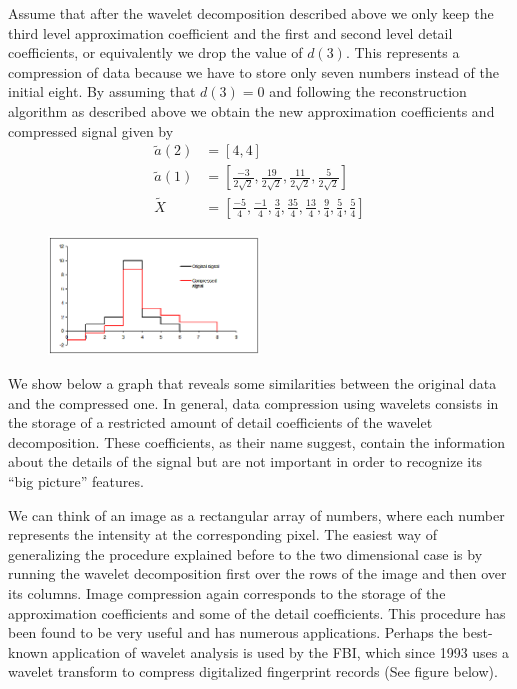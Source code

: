 
Assume that after the wavelet decomposition described above we only keep the third level approximation coefficient and the first and second level detail coefficients, or equivalently we drop the value of $d(3)$. This represents a compression of data because we have to store only seven numbers instead of the initial eight. By assuming that $d(3)=0$ and following the reconstruction algorithm as described above we obtain the new approximation coefficients and compressed signal given by
	\[
	\begin{split}
	\tilde{a}(2)&=[4,4] \\
	\tilde{a}(1)&=\left[ \frac{-3}{2\sqrt{2}}, \frac{19}{2\sqrt{2}}, \frac{11}{2\sqrt{2}}, \frac{5}{2\sqrt{2}} \right] \\
	\tilde{X}&=\left[ \frac{-5}{4},\frac{-1}{4},\frac{3}{4},\frac{35}{4},\frac{13}{4},\frac{9}{4},\frac{5}{4},\frac{5}{4} \right]
	\end{split}
	\]

	\begin{figure}[H]
	   \centering
	   \includegraphics[width=0.5\textwidth]{season1/107/images/original_signal_3.png} 
	\end{figure}

We show below a graph that reveals some similarities between the original data and the compressed one. In general, data compression using wavelets consists in the storage of a restricted amount of detail coefficients of the wavelet decomposition. These coefficients, as their name suggest, contain the information about the details of the signal but are not important in order to recognize its ``big picture'' features. \\


We can think of an image as a rectangular array of numbers, where each number represents the intensity at the corresponding pixel. The easiest way of generalizing the procedure explained before to the two dimensional case is by running the wavelet decomposition first over the rows of the image and then over its columns. Image compression again corresponds to the storage of the approximation coefficients and some of the detail coefficients. This procedure has been found to be very useful and has numerous applications. Perhaps the best-known application of wavelet analysis is used by the FBI, which since 1993 uses a wavelet transform to compress digitalized fingerprint records (See figure below). \\

